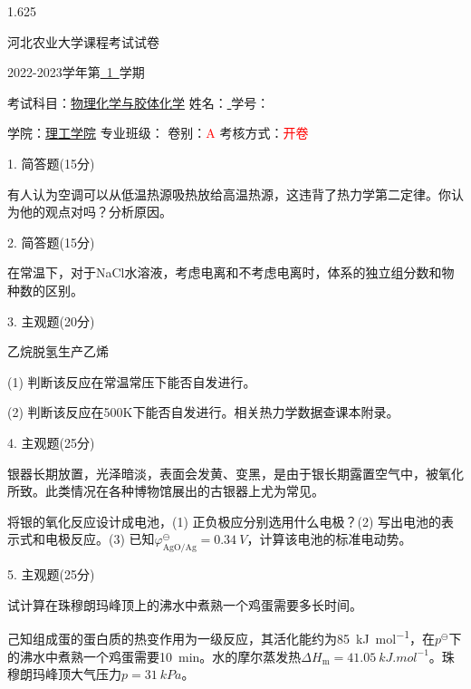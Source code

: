 \documentclass[12pt, b5paper]{article}
\newcommand*{\cred}{\textcolor{red}}
\begin{document}
\begin{spacing}{1.625}

\centerline{{\huge 河北农业大学课程考试试卷}}

\centerline{\large 2022-2023学年第\underline{\ 1\ }学期}

考试科目：\underline{物理化学与胶体化学} \quad 姓名：\underline{ \qquad \qquad} \quad 学号：\underline{ \qquad \qquad \qquad}

学院：\underline{理工学院} \quad 专业班级：\underline{\qquad \qquad \qquad \qquad} \quad 卷别：\cred{A} 考核方式：\cred{开卷}

\bigskip


1. 简答题(15分)

有人认为空调可以从低温热源吸热放给高温热源，这违背了热力学第二定律。你认为他的观点对吗？分析原因。

\bigskip

\bigskip

2. 简答题(15分)

在常温下，对于NaCl水溶液，考虑电离和不考虑电离时，体系的独立组分数和物种数的区别。

\bigskip

\bigskip

3. 主观题(20分)

乙烷脱氢生产乙烯 

(1) 判断该反应在常温常压下能否自发进行。

(2) 判断该反应在500K下能否自发进行。相关热力学数据查课本附录。

\bigskip

\bigskip

4. 主观题(25分)

银器长期放置，光泽暗淡，表面会发黄、变黑，是由于银长期露置空气中，被氧化所致。此类情况在各种博物馆展出的古银器上尤为常见。

\centerline{}

将银的氧化反应设计成电池，(1) 正负极应分别选用什么电极？(2) 写出电池的表示式和电极反应。(3) 已知$\varphi_\mathrm{AgO/Ag}^\ominus = \SI{0.34}{V}$，计算该电池的标准电动势。

\bigskip

\bigskip

5. 主观题(25分)

试计算在珠穆朗玛峰顶上的沸水中煮熟一个鸡蛋需要多长时间。

己知组成蛋的蛋白质的热变作用为一级反应，其活化能约为\SI{85}{kJ.mol^{-1}}，在$p^\ominus$下的沸水中煮熟一个鸡蛋需要\SI{10}{min}。水的摩尔蒸发热$\Delta H_\mathrm{m} = \SI{41.05}{kJ.mol^{-1}}$。珠穆朗玛峰顶大气压力$p=\SI{31}{kPa}$。



\end{spacing}
\end{document}
